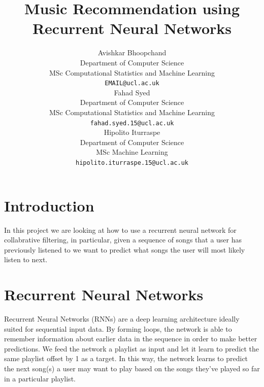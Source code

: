 \documentclass{article} %
\title{Music Recommendation using Recurrent Neural Networks}
\author{
Avishkar Bhoopchand\\
Department of Computer Science\\
MSc Computational Statistics and Machine Learning\\
\texttt{EMAIL@ucl.ac.uk} \\
\And
Fahad Syed\\
Department of Computer Science\\
MSc Computational Statistics and Machine Learning\\
\texttt{fahad.syed.15@ucl.ac.uk} \\
\And
Hipolito Iturraspe\\
Department of Computer Science\\
MSc Machine Learning\\
\texttt{hipolito.iturraspe.15@ucl.ac.uk} \\
}
\begin{document}
\maketitle
\clearpage

\section{Introduction}
In this project we are looking at how to use a recurrent neural network for collabrative filtering, in particular, given a sequence of songs that a user has previously listened to we want to predict what songs the user will most likely listen to next.


%



\section{Recurrent Neural Networks}
Recurrent Neural Networks (RNNs) are a deep learning architecture ideally suited for sequential input data. By forming loops, the network is able to remember information about earlier data in the sequence in order to make better predictions. We feed the network a playlist as input and let it learn to predict the same playlist offset by 1 as a target. In this way, the network learns to predict the next song(s) a user may want to play based on the songs they've played so far in a particular playlist. \cite{LSTM}
\end{document}
